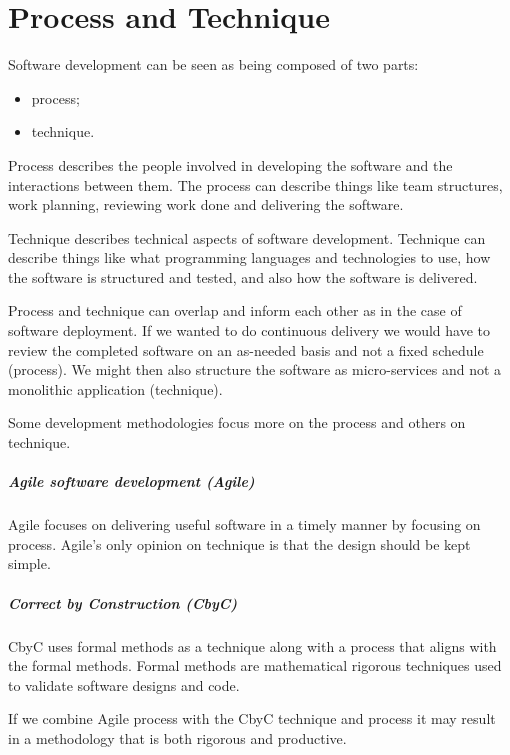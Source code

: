
\chapter{Process and Technique} %

\label{Chapter_ Process_and_Technique} %


Software development can be seen as being composed of two parts: 
\begin{itemize}
	\item process;
	\item technique.
\end{itemize}

Process describes the people involved in developing the software and the 
interactions between them. The process can describe things like team 
structures, work planning, reviewing work done and delivering the software. 

Technique describes technical aspects of software development. Technique can 
describe things like what programming languages and technologies to use, 
how the software is structured and tested, and also how the software is delivered. 

Process and technique can overlap and inform each other as in the case of software
deployment. If we wanted to do continuous delivery we would have to review 
the completed software on an as-needed basis and not a fixed schedule (process). 
We might then also structure the software as micro-services and not a monolithic 
application (technique).

Some development methodologies focus more on the process and others on technique.

\paragraph*{Agile software development (Agile)}
Agile focuses on delivering useful software in a timely manner by focusing on process.
Agile's only opinion on technique is that the design should be kept simple.

\paragraph*{Correct by Construction (CbyC)}
CbyC uses formal methods as a technique along with a process that 
aligns with the formal methods. Formal methods are mathematical rigorous techniques
used to validate software designs and code.

If we combine Agile process with the CbyC technique and process
it may result in a methodology that is both rigorous and productive.
